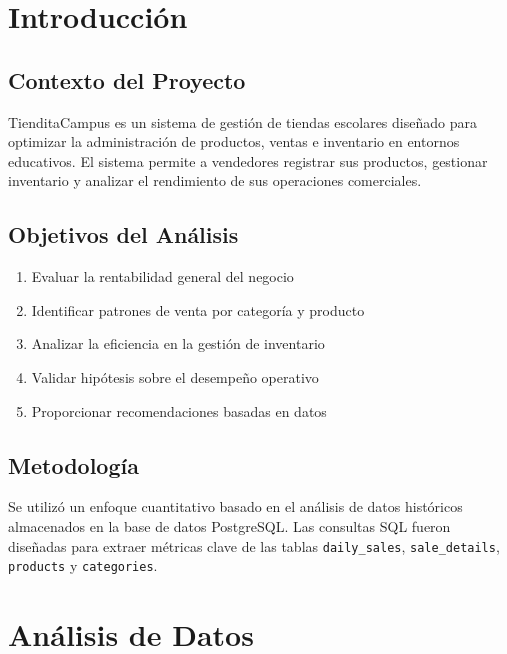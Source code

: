 \documentclass[12pt,a4paper]{article}
\begin{document}
\section{Introducción}
\subsection{Contexto del Proyecto}
TienditaCampus es un sistema de gestión de tiendas escolares diseñado para optimizar la administración de productos, ventas e inventario en entornos educativos. El sistema permite a vendedores registrar sus productos, gestionar inventario y analizar el rendimiento de sus operaciones comerciales.

\subsection{Objetivos del Análisis}
\begin{enumerate}
    \item Evaluar la rentabilidad general del negocio
    \item Identificar patrones de venta por categoría y producto
    \item Analizar la eficiencia en la gestión de inventario
    \item Validar hipótesis sobre el desempeño operativo
    \item Proporcionar recomendaciones basadas en datos
\end{enumerate}

\subsection{Metodología}
Se utilizó un enfoque cuantitativo basado en el análisis de datos históricos almacenados en la base de datos PostgreSQL. Las consultas SQL fueron diseñadas para extraer métricas clave de las tablas \texttt{daily\_sales}, \texttt{sale\_details}, \texttt{products} y \texttt{categories}.

\section{Análisis de Datos}
\end{document}
